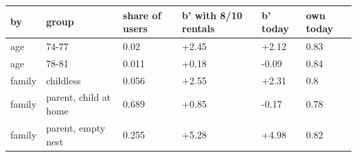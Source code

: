 \begingroup\small
\setlength{\tabcolsep}{3pt}
\renewcommand{\arraystretch}{1.04}
\begin{tabularx}{\linewidth}{XXXXXX}
\toprule
by & group & share of users & b' with 8/10 rentals & b' today & own today \\
\midrule
age & 74-77 & 0.02 & +2.45 & +2.12 & 0.83 \\
age & 78-81 & 0.011 & +0.18 & -0.09 & 0.84 \\
family & childless & 0.056 & +2.55 & +2.31 & 0.8 \\
family & parent, child at home & 0.689 & +0.85 & -0.17 & 0.78 \\
family & parent, empty nest & 0.255 & +5.28 & +4.98 & 0.82 \\
\bottomrule
\end{tabularx}
\endgroup
